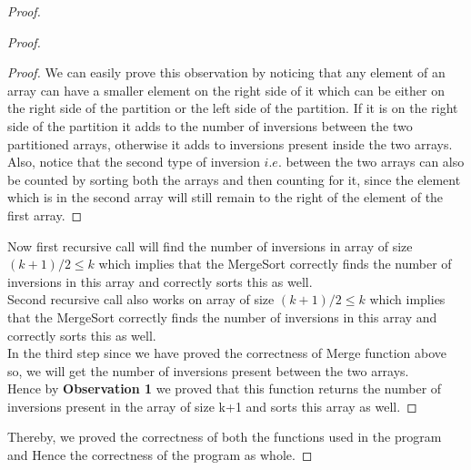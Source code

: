 \documentclass{article}
\begin{document}
{\begin {proof}
\begin{proof}
        \begin{proof}
        We can easily prove this observation by noticing that any element of an array can have a smaller element on the right side of it which can be either on the right side of the partition or the left side of the partition. If it is on the right side of the partition it adds to the number of inversions between the two partitioned arrays, otherwise it adds to inversions present inside the two arrays. Also, notice that the second type of inversion $i.e.$ between the two arrays can also be counted by sorting both the arrays and then counting for it, since the element which is in the second array will still remain to the right of the element of the first array.
        \end{proof}
        Now first recursive call will find the number of inversions in array of size $(k+1)/2 \le k$ which implies that the MergeSort correctly finds the number of inversions in this array and correctly sorts this as well. \\
        Second recursive call also works on array of size  $(k+1)/2 \le k$ which implies that the MergeSort correctly finds the number of inversions in this array and correctly sorts this as well.\\
        In the third step since we have proved the correctness of Merge function above so, we will get the number of inversions present between the two arrays. \\
        Hence by \textbf{Observation 1} we proved that this function returns the number of inversions present in the array of size k+1 and sorts this array as well.
        \end{proof}
        Thereby, we proved the correctness of both the functions used in the program and Hence the correctness of the program as whole. 
    \end{proof} 
}
\end{document}
